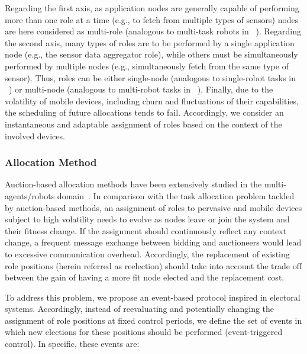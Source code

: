Regarding the first axis, as application nodes are generally capable of performing more than one role at a time (e.g., to fetch from multiple types of sensors) nodes are here considered as multi-role (analogous to multi-task robots in ~\cite{Gerkey:2004}). Regarding the second axis, many types of roles are to be performed by a single application node (e.g., the sensor data aggregator role), while others must be simultaneously performed by multiple nodes (e.g., simultaneously fetch from the same type of sensor). Thus, roles can be either single-node (analogous to single-robot tasks in ~\cite{Gerkey:2004}) or multi-node (analogous to multi-robot tasks in ~\cite{Gerkey:2004}). Finally, due to the volatility of mobile devices, including churn and fluctuations of their capabilities, the scheduling of future allocations tends to fail. Accordingly, we consider an instantaneous and adaptable assignment of roles based on the context of the involved devices. 

\subsubsection{\textbf{Allocation Method}} Auction-based allocation methods have been extensively studied in the multi-agents/robots domain~\cite{Korsah:2013}. In comparison with the task allocation problem tackled by auction-based methods, an assignment of roles to pervasive and mobile devices subject to high volatility needs to evolve as nodes leave or join the system and their fitness change. If the assignment should continuously reflect any context change, a frequent message exchange between bidding and auctioneers would lead to excessive communication overhead. Accordingly, the replacement of existing role positions (herein referred as reelection) should take into account the trade off between the gain of having a more fit node elected and the replacement cost. 


To address this problem, we propose an event-based protocol inspired in electoral systems. Accordingly, instead of reevaluating and potentially changing the assignment of role positions at fixed control periods, we define the set of events in which new elections for these positions should be performed (event-triggered control). In specific, these events are:	

